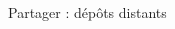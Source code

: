 \documentclass[table,tikz,12pt,svgnames]{beamer}
\begin{document}
\begin{frame}{Partager : dépôts distants}
\begin{adjustwidth}{-0.75cm}{0cm}{}
\vspace{-1em}
	\begin{center}
	\end{center}
\end{adjustwidth}
\end{frame}
\end{document}
